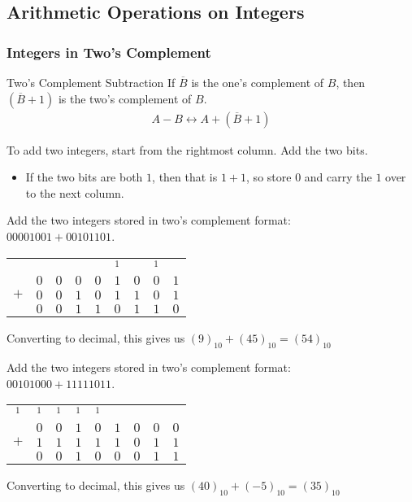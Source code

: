 \documentclass[../notes.tex]{subfiles}
\begin{document}
			\subsection{Arithmetic Operations on Integers}
				\subsubsection{Integers in Two's Complement}
					\begin{definition}{Two's Complement Subtraction}
						If $\overline{B}$ is the one's complement of $B$, then $\left(\overline{B} + 1\right)$ is the two's complement of $B$.
						\begin{align*}
							A - B \leftrightarrow A + \left(\overline{B} + 1\right)
						\end{align*}
					\end{definition}
					To add two integers, start from the rightmost column. Add the two bits.
					\begin{itemize}
						\item If the two bits are both $1$, then that is $1 + 1$, so store $0$ and carry the $1$ over to the next column.
					\end{itemize}
					\begin{example}
						Add the two integers stored in two's complement format:\\
						$00001001 + 00101101$.
						\begin{center}
							\begin{tabular}{ccccccccc}
								    &     &     &     &     & $^{1}$ &     & $^{1}$ & \\
								    & $0$ & $0$ & $0$ & $0$ & $1$    & $0$ & $0$    & $1$\\
								$+$ & $0$ & $0$ & $1$ & $0$ & $1$    & $1$ & $0$    & $1$\\
								\midrule
								    & $0$ & $0$ & $1$ & $1$ & $0$ & $1$ & $1$ & $0$
							\end{tabular}
						\end{center}
						Converting to decimal, this gives us $(9)_{10} + (45)_{10} = (54)_{10}$
					\end{example}
					\begin{example}
						Add the two integers stored in two's complement format:\\
						$00101000 + 11111011$.
						\begin{center}
							\begin{tabular}{ccccccccc}
								$^{1}$ & $^{1}$ & $^{1}$ & $^{1}$ & $^{1}$ &     &     &     &    \\
								       & $0$    & $0$    & $1$    & $0$    & $1$ & $0$ & $0$ & $0$\\
								$+$    & $1$    & $1$    & $1$    & $1$    & $1$ & $0$ & $1$ & $1$\\
								\midrule
								       & $0$    & $0$    & $1$    & $0$    & $0$ & $0$ & $1$ & $1$
							\end{tabular}
						\end{center}
						Converting to decimal, this gives us $(40)_{10} + (-5)_{10} = (35)_{10}$
					\end{example}
\end{document}
